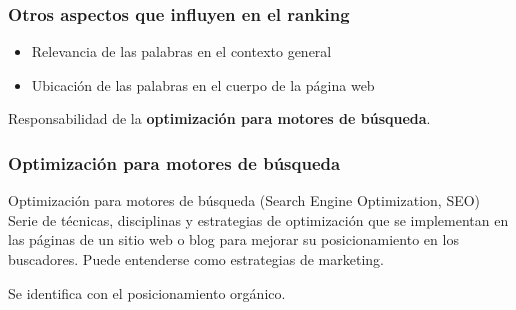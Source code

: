 \documentclass[
10pt, %
aspectratio=169, %
]{beamer}
\begin{document}
	\begin{frame}
		
		\frametitle{Otros aspectos que influyen en el ranking}
		
		\begin{itemize}
			\item Relevancia de las palabras en el contexto general
			\item Ubicación de las palabras en el cuerpo de la página web
		\end{itemize}
		
		\vspace{3\baselineskip}
		Responsabilidad de la \textbf{optimización para motores de búsqueda}.
		
	\end{frame}
	
	\begin{frame}
		
		\frametitle{Optimización para motores de búsqueda}
		
		\begin{alertblock}{Optimización para motores de búsqueda (Search Engine Optimization, SEO)}
			Serie de técnicas, disciplinas y estrategias de optimización que se implementan en las páginas de un sitio web o blog para mejorar su posicionamiento en los buscadores. Puede entenderse como estrategias de marketing.
		\end{alertblock}
		
		\vspace{2\baselineskip}
		
		Se identifica con el posicionamiento orgánico.
		
	\end{frame}
	
\end{document}
